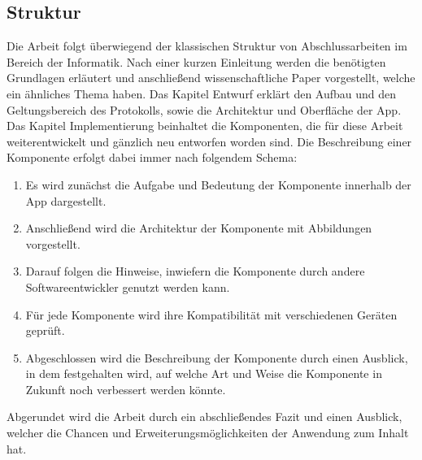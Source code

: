 \subsection{Struktur}
Die Arbeit folgt überwiegend der klassischen Struktur von Abschlussarbeiten im Bereich der Informatik. Nach einer kurzen Einleitung werden die benötigten Grundlagen erläutert und anschließend wissenschaftliche Paper vorgestellt, welche ein ähnliches Thema haben. Das Kapitel Entwurf erklärt den Aufbau und den Geltungsbereich des Protokolls, sowie die Architektur und Oberfläche der App. Das Kapitel Implementierung beinhaltet die Komponenten, die für diese Arbeit weiterentwickelt und gänzlich neu entworfen worden sind. Die Beschreibung einer Komponente erfolgt dabei immer nach folgendem Schema:\newline
\begin{enumerate}
	\item Es wird zunächst die Aufgabe und Bedeutung der Komponente innerhalb der App dargestellt.
	\item Anschließend wird die Architektur der Komponente mit Abbildungen vorgestellt.
	\item Darauf folgen die Hinweise, inwiefern die Komponente durch andere Softwareentwickler genutzt werden kann.
	\item Für jede Komponente wird ihre Kompatibilität mit verschiedenen Geräten geprüft.
	\item Abgeschlossen wird die Beschreibung der Komponente durch einen Ausblick, in dem festgehalten wird, auf welche Art und Weise die Komponente in Zukunft noch verbessert werden könnte.\\
\end{enumerate}
Abgerundet wird die Arbeit durch ein abschließendes Fazit und einen Ausblick, welcher die Chancen und Erweiterungsmöglichkeiten der Anwendung zum Inhalt hat.
\newpage


